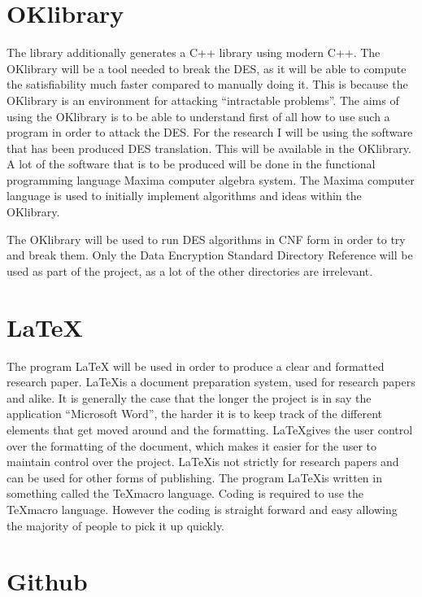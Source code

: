 \documentclass[11pt,a4paper, notitlepage]{report}
\begin{document}
\section{OKlibrary}
\label{sec:OKl}

The library additionally generates a C++ library using modern C++.
The OKlibrary will be a tool needed to break the DES, as it will be able to compute the satisfiability much faster compared to manually doing it. This is because the OKlibrary is an environment for attacking “intractable problems”. The aims of using the OKlibrary is to be able to understand first of all how to use such a program in order to attack the DES.
For the research I will be using the software that has been produced DES translation. This will be available in the OKlibrary. A lot of the software that is to be produced will be done in the functional programming language Maxima computer algebra system. The Maxima computer language is used to initially implement algorithms and ideas within the OKlibrary.

The OKlibrary will be used to run DES algorithms in CNF form in order to try and break them. Only the Data Encryption Standard Directory Reference will be used as part of the project, as a lot of the other directories are irrelevant.


\section{ \LaTeX}
\label{sec:LaTeX}

The program LaTeX will be used in order to produce a clear and formatted research paper. \LaTeX\space is a document preparation system, used for research papers and alike. It is generally the case that the longer the project is in say the application “Microsoft Word”, the harder it is to keep track of the different elements that get moved around and the formatting. \LaTeX\space gives the user control over the formatting of the document, which makes it easier for the user to maintain control over the project. \LaTeX\space is not strictly for research papers and can be used for other forms of publishing. The program \LaTeX\space is written in something called the \TeX\space macro language. Coding is required to use the \TeX\space macro language. However the coding is straight forward and easy allowing the majority of people to pick it up quickly.


\section{Github}
\label{sec:Git}
\end{document}
